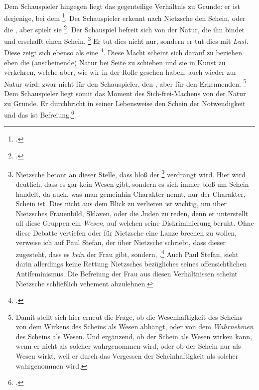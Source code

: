 \documentclass[12pt, a4paper, openany]{report}
\begin{document}
Dem Schauspieler hingegen liegt das gegenteilige Verhältnis zu Grunde: 
er ist derjenige, bei dem \footcite[][596]{nietzsche_morgenrote_1999}.
Der Schauspieler erkennt nach Nietzsche den Schein, oder die , aber spielt sie \footcite[][608]{nietzsche_morgenrote_1999}.
Der Schauspiel befreit sich von der Natur, die ihn bindet und erschafft einen Schein.%
\footnote{
    Nietzsche betont an dieser Stelle, dass bloß der \footcite[][608]{nietzsche_morgenrote_1999} verdrängt wird.
    Hier wird deutlich, dass es gar kein Wesen gibt, sondern es sich immer bloß um Schein handelt, da auch, was man gemeinhin Charakter nennt, nur der  Charakter, Schein ist.
    Dies nicht aus dem Blick zu verlieren ist wichtig, um über Nietzsches Frauenbild, Sklaven, oder die Juden zu reden, denn er unterstellt all diese Gruppen ein \emph{Wesen}, auf welchen seine Diskriminierung beruht. 
    Ohne diese Debatte vertiefen oder für Nietzsche eine Lanze brechen zu wollen, verweise ich auf Paul Stefan, der über Nietzsche schriebt, dass dieser zugesteht, dass es \emph{kein}  der Frau gibt, sondern, .\footcite[Vgl.][50]{stephan_nietzscheanismus_2019} 
    Auch Paul Stefan, sieht darin allerdings keine Rettung Nietzsches bezügliches seines offensichtlichen Antifeminismus.
    Die Befreiung der Frau aus diesen Verhältnissen scheint Nietzsche schließlich vehement abzulehnen.
}
Er tut dies nicht nur, sondern er tut dies mit \emph{Lust}.
Diese  zeigt sich ebenso als eine \footcite[][608]{nietzsche_morgenrote_1999}.
Diese Macht scheint sich darauf zu beziehen eben die (anscheinende) Natur bei Seite zu schieben und sie in Kunst zu verkehren, welche aber, wie wir in der Rolle gesehen haben, auch wieder zur Natur wird; 
zwar nicht für den Schauspieler, den , aber für den Erkennenden.%
\footnote{
    Damit stellt sich hier erneut die Frage, ob die Wesenhaftigkeit des Scheins von dem Wirkens des Scheins als Wesen abhängt, oder von dem \emph{Wahrnehmen} des Scheins als Wesen.
    Und ergänzend, ob der Schein als Wesen wirken kann, wenn er nicht als solcher wahrgenommen wird, oder ob der Schein nur als Wesen wirkt, weil er durch das Vergessen der Scheinhaftigkeit als solcher wahrgenommen wird.
}
Dem Schauspieler liegt somit das Moment des Sich-frei-Machens von der Natur zu Grunde. 
Er durchbricht in seiner Lebensweise den Schein der Notwendigkeit und das ist Befreiung.\footcite[Vgl.][41]{menke_autonomie_2018}.
\end{document}
